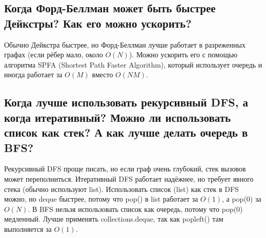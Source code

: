\documentclass{article}
\begin{document}
\subsection*{Когда Форд-Беллман может быть быстрее Дейкстры? Как его можно ускорить?}
Обычно Дейкстра быстрее, но Форд-Беллман лучше работает в разреженных графах (если рёбер мало, около $O(N)$).
Можно ускорить его с помощью алгоритма SPFA (Shortest Path Faster Algorithm), который использует очередь и иногда работает за $O(M)$ вместо $O(NM)$.

\subsection*{Когда лучше использовать рекурсивный DFS, а когда итеративный? Можно ли использовать список как стек? А как лучше делать очередь в BFS?}
Рекурсивный DFS проще писать, но если граф очень глубокий, стек вызовов может переполниться.
Итеративный DFS работает надёжнее, но требует явного стека (обычно используют list).
Использовать список (list) как стек в DFS можно, но deque быстрее, потому что pop() в list работает за $O(1)$, а pop(0) за $O(N)$.
В BFS нельзя использовать список как очередь, потому что pop(0) медленный. Лучше применять collections.deque, так как popleft() там выполняется за $O(1)$.
\end{document}

